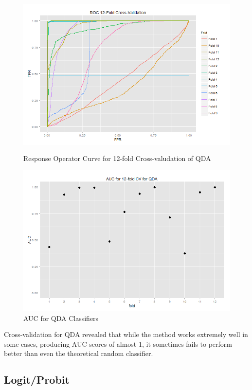 \documentclass{article}\usepackage[]{graphicx}\usepackage[]{color}
\begin{document}
\begin{figure}[h]
  \includegraphics[width=\linewidth]{QDArocCV.png}
  \caption{Response Operator Curve for 12-fold Cross-valudation of QDA}\label{}
\endminipage\hfill
{}
  \includegraphics[width=\linewidth]{AUCcvQDA.png}
  \caption{AUC for QDA Classifiers}\label{rocauc}
\endminipage\hfill
\end{figure}

Cross-validation for QDA revealed that while the method works extremely well in some cases, producing AUC scores of almost 1, it sometimes fails to perform better than even the theoretical random classifier.

\subsection{Logit/Probit}
\end{document}
